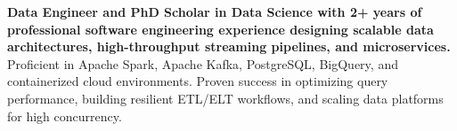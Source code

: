 \documentclass[../main.tex]{subfiles}
\begin{document}
\textbf{Data Engineer and PhD Scholar in Data Science with 2+ years of professional software engineering experience designing scalable data architectures, high-throughput streaming pipelines, and microservices.}
Proficient in Apache Spark, Apache Kafka, PostgreSQL, BigQuery, and containerized cloud environments.
Proven success in optimizing query performance, building resilient ETL/ELT workflows, and scaling data platforms for high concurrency.
\end{document}
